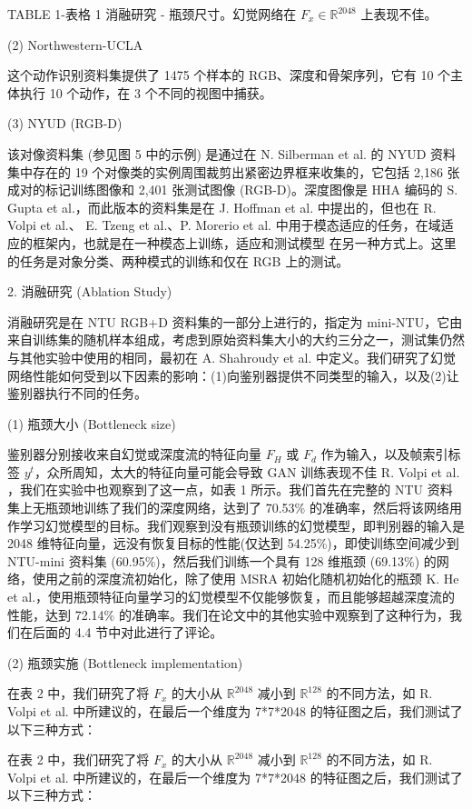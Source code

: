 TABLE 1-表格 1 消融研究 - 瓶颈尺寸。幻觉网络在 $F_{x} \in \mathbb{R}^{2048}$ 上表现不佳。

(2) Northwestern-UCLA

这个动作识别资料集提供了 1475 个样本的 RGB、深度和骨架序列，它有 10 个主体执行 10 个动作，在 3 个不同的视图中捕获。

(3) NYUD (RGB-D)

该对像资料集 (参见图 5 中的示例) 是通过在 N. Silberman et al. 的 NYUD 资料集中存在的 19 个对像类的实例周围裁剪出紧密边界框来收集的，它包括 2,186 张成对的标记训练图像和 2,401 张测试图像 (RGB-D)。深度图像是 HHA 编码的 S. Gupta et al.，而此版本的资料集是在 J. Hoffman et al. 中提出的，但也在 R. Volpi et al.、 E. Tzeng et al.、P. Morerio et al. 中用于模态适应的任务，在域适应的框架内，也就是在一种模态上训练，适应和测试模型 在另一种方式上。这里的任务是对象分类、两种模式的训练和仅在 RGB 上的测试。

2. 消融研究 (Ablation Study) 

消融研究是在 NTU RGB+D 资料集的一部分上进行的，指定为 mini-NTU，它由来自训练集的随机样本组成，考虑到原始资料集大小的大约三分之一，测试集仍然与其他实验中使用的相同，最初在 A. Shahroudy et al. 中定义。我们研究了幻觉网络性能如何受到以下因素的影响：(1)向鉴别器提供不同类型的输入，以及(2)让鉴别器执行不同的任务。

(1) 瓶颈大小 (Bottleneck size) 

鉴别器分别接收来自幻觉或深度流的特征向量 $F_{H}$ 或 $F_{d}$ 作为输入，以及帧索引标签 $y^{t}$，众所周知，太大的特征向量可能会导致 GAN 训练表现不佳  R. Volpi et al. ，我们在实验中也观察到了这一点，如表 1 所示。我们首先在完整的 NTU 资料集上无瓶颈地训练了我们的深度网络，达到了 70.53\% 的准确率，然后将该网络用作学习幻觉模型的目标。我们观察到没有瓶颈训练的幻觉模型，即判别器的输入是 2048 维特征向量，远没有恢复目标的性能(仅达到 54.25\%)，即使训练空间减少到 NTU-mini 资料集 (60.95\%)，然后我们训练一个具有 128 维瓶颈 (69.13\%) 的网络，使用之前的深度流初始化，除了使用 MSRA 初始化随机初始化的瓶颈 K. He et al.，使用瓶颈特征向量学习的幻觉模型不仅能够恢复，而且能够超越深度流的性能，达到 72.14\% 的准确率。我们在论文中的其他实验中观察到了这种行为，我们在后面的 4.4 节中对此进行了评论。

(2) 瓶颈实施 (Bottleneck implementation) 

在表 2 中，我们研究了将 $F_{x}$ 的大小从 $\mathbb{R}^{2048}$ 减小到 $\mathbb{R}^{128}$ 的不同方法，如  R. Volpi et al. 中所建议的，在最后一个维度为 7*7*2048 的特征图之后，我们测试了以下三种方式：

在表 2 中，我们研究了将 $F_{x}$ 的大小从 $\mathbb{R}^{2048}$ 减小到 $\mathbb{R}^{128}$ 的不同方法，如  R. Volpi et al. 中所建议的，在最后一个维度为 7*7*2048 的特征图之后，我们测试了以下三种方式：

